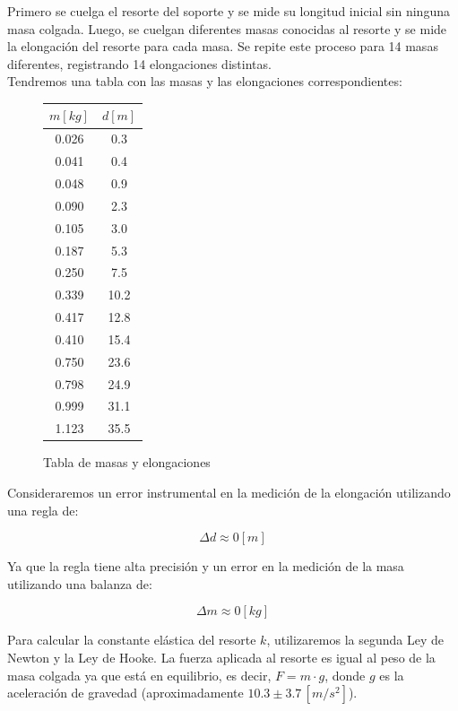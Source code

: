 \documentclass{article}
\begin{document}
\begin{multicols}{2}
    Primero se cuelga el resorte del soporte y se mide su longitud inicial sin ninguna masa colgada.
    Luego, se cuelgan diferentes masas conocidas al resorte y se mide la elongación del resorte 
    para cada masa. Se repite este proceso para 14 masas diferentes, registrando 14 elongaciones 
    distintas.
    \\ Tendremos una tabla con las masas y las elongaciones correspondientes:
    \begin{figure}[H]
    \begin{center}
        \begin{tabular}{|c|c|}
            \hline
            $ m [kg]$ & $ d [m]$ \\
            \hline
            0.026 & 0.3 \\
            0.041 & 0.4 \\
            0.048 & 0.9 \\
            0.090 & 2.3 \\
            0.105 & 3.0 \\
            0.187 & 5.3 \\
            0.250 & 7.5 \\
            0.339 & 10.2 \\
            0.417 & 12.8 \\
            0.410 & 15.4 \\
            0.750 & 23.6 \\
            0.798 & 24.9 \\
            0.999 & 31.1 \\
            1.123 & 35.5 \\
            \hline
        \end{tabular}
    \end{center}
    \caption{Tabla de masas y elongaciones}
    \end{figure}
    Consideraremos un error instrumental en la medición de la elongación utilizando una regla
    de:
    
    \begin{equation}
        \Delta d \approx 0 [m]
    \end{equation}

    Ya que la regla tiene alta precisión y un error en la medición de la masa utilizando una balanza de:

    \begin{equation}
        \Delta m \approx 0 [kg]
    \end{equation}

    Para calcular la constante elástica del resorte $k$, utilizaremos la segunda Ley de Newton
        y la Ley de Hooke. La fuerza aplicada al resorte es igual al peso de la masa colgada ya que
        está en equilibrio, es decir, $F = m \cdot g$, donde $g$ es la aceleración de gravedad 
        (aproximadamente $10.3 \pm 3.7\, [m/s^2]$). 


\end{multicols}
\end{document}
